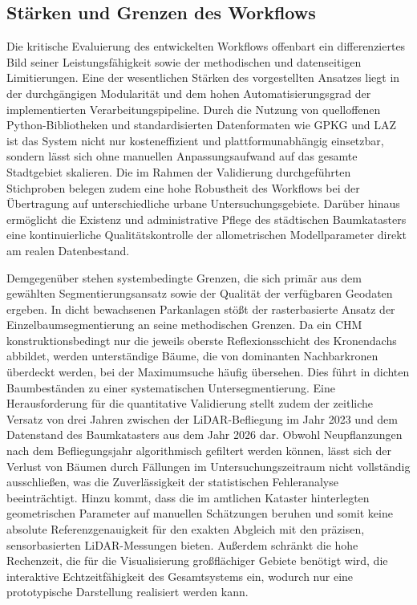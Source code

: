 \subsection{Stärken und Grenzen des Workflows}

Die kritische Evaluierung des entwickelten Workflows offenbart ein differenziertes Bild seiner Leistungsfähigkeit sowie der methodischen und datenseitigen Limitierungen. Eine der wesentlichen Stärken des vorgestellten Ansatzes liegt in der durchgängigen Modularität und dem hohen Automatisierungsgrad der implementierten Verarbeitungspipeline. Durch die Nutzung von quelloffenen Python-Bibliotheken und standardisierten Datenformaten wie GPKG und LAZ ist das System nicht nur kosteneffizient und plattformunabhängig einsetzbar, sondern lässt sich ohne manuellen Anpassungsaufwand auf das gesamte Stadtgebiet skalieren. Die im Rahmen der Validierung durchgeführten Stichproben belegen zudem eine hohe Robustheit des Workflows bei der Übertragung auf unterschiedliche urbane Untersuchungsgebiete. Darüber hinaus ermöglicht die Existenz und administrative Pflege des städtischen Baumkatasters eine kontinuierliche Qualitätskontrolle der allometrischen Modellparameter direkt am realen Datenbestand.

Demgegenüber stehen systembedingte Grenzen, die sich primär aus dem gewählten Segmentierungsansatz sowie der Qualität der verfügbaren Geodaten ergeben. In dicht bewachsenen Parkanlagen stößt der rasterbasierte Ansatz der Einzelbaumsegmentierung an seine methodischen Grenzen. Da ein CHM konstruktionsbedingt nur die jeweils oberste Reflexionsschicht des Kronendachs abbildet, werden unterständige  Bäume, die von dominanten Nachbarkronen überdeckt werden, bei der Maximumsuche häufig übersehen. Dies führt in dichten Baumbeständen zu einer systematischen Untersegmentierung. Eine Herausforderung für die quantitative Validierung stellt zudem der zeitliche Versatz von drei Jahren zwischen der LiDAR-Befliegung im Jahr 2023 und dem Datenstand des Baumkatasters aus dem Jahr 2026 dar. Obwohl Neupflanzungen nach dem Befliegungsjahr algorithmisch gefiltert werden können, lässt sich der Verlust von Bäumen durch Fällungen im Untersuchungszeitraum nicht vollständig ausschließen, was die Zuverlässigkeit der statistischen Fehleranalyse beeinträchtigt. Hinzu kommt, dass die im amtlichen Kataster hinterlegten geometrischen Parameter auf manuellen Schätzungen beruhen und somit keine absolute Referenzgenauigkeit für den exakten Abgleich mit den präzisen, sensorbasierten LiDAR-Messungen bieten. Außerdem schränkt die hohe Rechenzeit, die für die Visualisierung großflächiger Gebiete benötigt wird, die interaktive Echtzeitfähigkeit des Gesamtsystems ein, wodurch nur eine prototypische Darstellung realisiert werden kann.